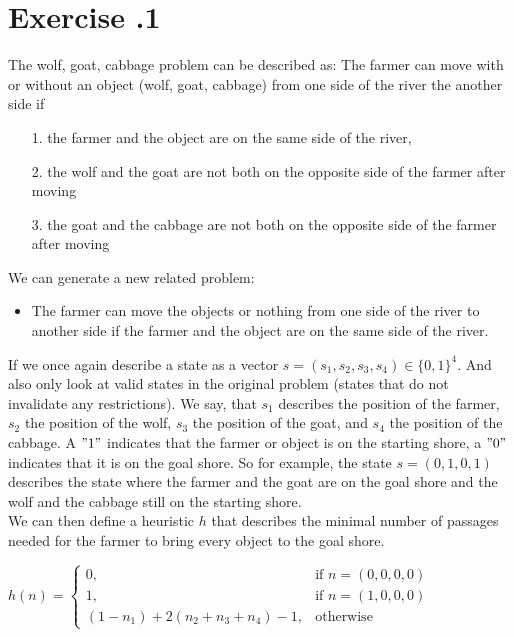 \documentclass[11pt]{scrartcl}
\author{Oliver Strassmann \\
        Julia Kostadinova \\
        Alessio Brazerol}
\newcounter{sheetnr}
\newenvironment{exercise}[2][]{\section*{Exercise \thesheetnr.#2\expandafter\ifstrempty\expandafter{#1}{}{\ (#1)}}}{}
\newenvironment{subexercises}{\begin{enumerate}[a), font=\bfseries, wide, labelindent=0pt]}{\end{enumerate}}
\begin{document}
	\begin{exercise}[Heuristics]{1}
        \begin{subexercises}
            \item The wolf, goat, cabbage problem can be     described as:
            The farmer can move with or without an object (wolf, goat, cabbage) from one side of the river the another side if
            \begin{itemize}
                \item[1.] the farmer and the object are on the same side of the river,
                \item[2.] the wolf and the goat are not both on the opposite side of the farmer after moving
                \item[3.] the goat and the cabbage are not both on the opposite side of the farmer after moving
            \end{itemize}
                We can generate a new related problem:
            \begin{itemize}
                \item The farmer can move the objects or nothing from one side of the river to another side if the farmer and the object are on the same side of the river.
            \end{itemize}
            If we once again describe a state as a vector $s = (s_1, s_2, s_3, s_4) \in \{0,1\}^4$. And also only look at valid states in the original problem (states that do not invalidate any restrictions). We say, that $s_1$ describes the position of the farmer, $s_2$ the position of the wolf, $s_3$ the position of the goat, and $s_4$ the position of the cabbage. A $"1"$ indicates that the farmer or object is on the starting shore, a $"0"$ indicates that it is on the goal shore. So for example, the state $s=(0,1,0,1)$ describes the state where the farmer and the goat are on the goal shore and the wolf and the cabbage still on the starting shore. \\
            
            We can then define a heuristic $h$ that describes the minimal number of passages needed for the farmer to bring every object to the goal shore. \\
            
            \begin{center}
                \item $h(n) = 
                    \begin{cases}
                        0,& \text{if } n = (0,0,0,0)\\
                        1,& \text{if } n = (1,0,0,0)\\ 
                        (1 - n_1) + 2(n_2 + n_3 + n_4) - 1,& \text{otherwise}
                    \end{cases}$ \\
            \end{center}
            

\end{subexercises}
\end{exercise}
\end{document}
